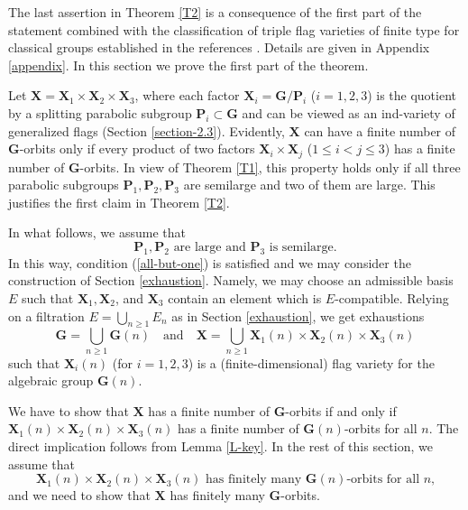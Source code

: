 \documentclass[12pt]{amsart}
\newcommand{\G}{\mathbf{G}}
\renewcommand{\H}{\mathbf{H}}
\renewcommand{\P}{\mathbf{P}}
\newcommand{\X}{\mathbf{X}}
\numberwithin{equation}{section}
\theoremstyle{definition}
\begin{document}
\label{section-7}


The last assertion in Theorem \ref{T2} is a consequence of the first part of the statement combined with the classification of triple flag varieties of finite type for classical groups established in the references \cite{MWZ1,MWZ2,Matsuki1,Matsuki2}. Details are given in Appendix \ref{appendix}. In this section we prove the first part of the theorem.


Let $\X=\X_1\times \X_2\times \X_3$, where each factor $\X_i=\G/\P_i$ ($i=1,2,3$) is the quotient by a splitting parabolic subgroup $\P_i\subset\G$ and can be viewed as an ind-variety of generalized flags (Section \ref{section-2.3}). Evidently, $\X$ can have a finite number of $\G$-orbits only if every product of two factors $\X_i\times \X_j$ ($1\leq i<j\leq 3$) has a finite number of $\G$-orbits. In view of Theorem \ref{T1}, this property holds only if all three parabolic subgroups $\P_1,\P_2,\P_3$ are semilarge and two of them are large. This justifies the first claim in Theorem \ref{T2}. 

In what follows, we assume that 
\[\mbox{$\P_1,\P_2$ are large and $\P_3$ is semilarge}.\]
In this way, condition (\ref{all-but-one}) is satisfied and we may consider the construction of Section \ref{exhaustion}. Namely, we may choose an admissible basis $E$ such that $\X_1,\X_2$, and $\X_3$ contain an element which is $E$-compatible.
Relying on a filtration $E=\bigcup_{n\geq 1} E_n$ as in Section \ref{exhaustion}, we get exhaustions
\[\G=\bigcup_{n\geq 1}\G(n)\quad\mbox{and}\quad\X=\bigcup_{n\geq 1} \X_1(n)\times \X_2(n)\times \X_3(n)\]
such that $\X_i(n)$ (for $i=1,2,3$) is a (finite-dimensional) flag variety for the algebraic group $\G(n)$.

We have to show that $\X$ has a finite number of $\G$-orbits if and only if $\X_1(n)\times \X_2(n)\times \X_3(n)$ has a finite number of $\G(n)$-orbits for all $n$. The direct implication follows from Lemma \ref{L-key}. In the rest of this section, we assume that
\begin{equation}
\label{8}
\mbox{$\X_1(n)\times \X_2(n)\times \X_3(n)$ has finitely many $\G(n)$-orbits for all $n$,}
\end{equation}
and we need to show that $\X$ has finitely many $\G$-orbits.
\end{document}
